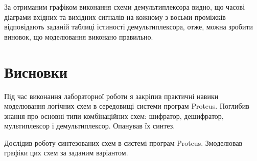 \documentclass{article}
\begin{document}
\begin{normalsize}
	За отриманим графіком виконання схеми демультиплексора видно, що часові діаграми вхідних та вихідних сигналів на кожному з восьми проміжків відповідають заданій таблиці істиності демультиплексора, отже, можна зробити виновок, що моделювання виконано правильно.

	\section*{Висновки}
	Під час виконання лабораторної роботи я закріпив практичні навики моделювання логічних схем в середовищі системи програм Proteus. 
	Поглибив знання про основні типи комбінаційних схем: шифратор, дешифратор, мультиплексор і демультиплексор. Опанував їх синтез. 
	
	Дослідив роботу синтезованих схем в системі програм Proteus. Змоделював графіки цих схем за заданим варіантом.
	    
\end{normalsize}
\end{document}
